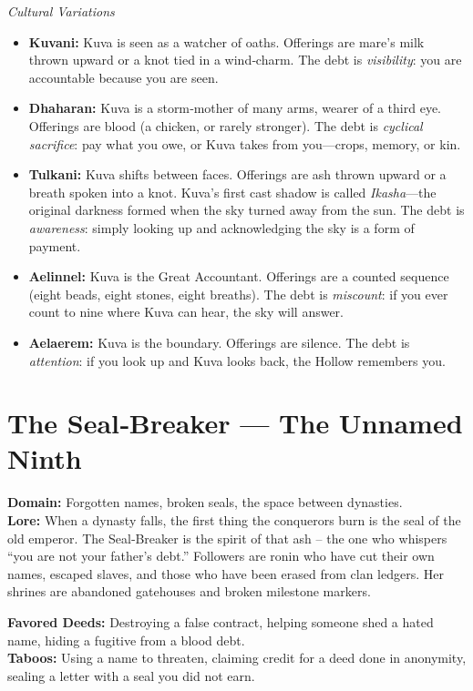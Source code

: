 \documentclass[12pt]{book}
\begin{document}
\noindent\textit{Cultural Variations}
\begin{itemize}
    \item \textbf{Kuvani:} Kuva is seen as a watcher of oaths. Offerings are mare's milk thrown upward or a knot tied in a wind‑charm. The debt is \emph{visibility}: you are accountable because you are seen.
    \item \textbf{Dhaharan:} Kuva is a storm‑mother of many arms, wearer of a third eye. Offerings are blood (a chicken, or rarely stronger). The debt is \emph{cyclical sacrifice}: pay what you owe, or Kuva takes from you---crops, memory, or kin.
    \item \textbf{Tulkani:} Kuva shifts between faces. Offerings are ash thrown upward or a breath spoken into a knot. Kuva's first cast shadow is called \emph{Ikasha}---the original darkness formed when the sky turned away from the sun. The debt is \emph{awareness}: simply looking up and acknowledging the sky is a form of payment.
    \item \textbf{Aelinnel:} Kuva is the Great Accountant. Offerings are a counted sequence (eight beads, eight stones, eight breaths). The debt is \emph{miscount}: if you ever count to nine where Kuva can hear, the sky will answer.
    \item \textbf{Aelaerem:} Kuva is the boundary. Offerings are silence. The debt is \emph{attention}: if you look up and Kuva looks back, the Hollow remembers you.
\end{itemize}

\section{The Seal‑Breaker --- The Unnamed Ninth}

\noindent\textbf{Domain:} Forgotten names, broken seals, the space between dynasties.\\
\textbf{Lore:} When a dynasty falls, the first thing the conquerors burn is the seal of the old emperor. The Seal‑Breaker is the spirit of that ash – the one who whispers “you are not your father’s debt.” Followers are ronin who have cut their own names, escaped slaves, and those who have been erased from clan ledgers. Her shrines are abandoned gatehouses and broken milestone markers.

\textbf{Favored Deeds:} Destroying a false contract, helping someone shed a hated name, hiding a fugitive from a blood debt.\\
\textbf{Taboos:} Using a name to threaten, claiming credit for a deed done in anonymity, sealing a letter with a seal you did not earn.
\end{document}
